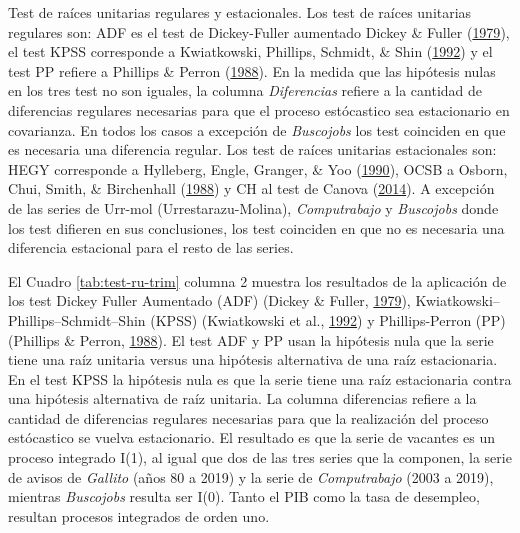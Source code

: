 \documentclass[12pt,oneside]{reedthesis}
\begin{document}
\begin{table}
{\begin{threeparttable}
\begin{tablenotes}
\item \footnotesize Test de raíces unitarias regulares y estacionales. Los test de raíces unitarias regulares son: ADF es el test de Dickey-Fuller aumentado Dickey \& Fuller (\protect\hyperlink{ref-DickeyFuller1979}{1979}), el test KPSS corresponde a Kwiatkowski, Phillips, Schmidt, \& Shin (\protect\hyperlink{ref-KPSS1992}{1992}) y el test PP refiere a Phillips \& Perron (\protect\hyperlink{ref-PhillipsPerron1988}{1988}). En la medida que las hipótesis nulas en los tres test no son iguales, la columna \textit{Diferencias} refiere a la cantidad de diferencias regulares necesarias para que el proceso estócastico sea estacionario en covarianza. En todos los casos a excepción de \textit{Buscojobs} los test coinciden en que es necesaria una diferencia regular. Los test de raíces unitarias estacionales son: HEGY corresponde a Hylleberg, Engle, Granger, \& Yoo (\protect\hyperlink{ref-hegy1990}{1990}), OCSB a Osborn, Chui, Smith, \& Birchenhall (\protect\hyperlink{ref-Osborn1988}{1988}) y CH al test de Canova (\protect\hyperlink{ref-Canova1995}{2014}). A excepción de las series de Urr-mol (Urrestarazu-Molina), \textit{Computrabajo} y \textit{Buscojobs} donde los test difieren en sus conclusiones, los test coinciden en que no es necesaria una diferencia estacional para el resto de las series.
\end{tablenotes}
\end{threeparttable}}
\end{table}
El Cuadro \ref{tab:test-ru-trim} columna 2 muestra los resultados de la aplicación de los test Dickey Fuller Aumentado (ADF) (Dickey \& Fuller, \protect\hyperlink{ref-DickeyFuller1979}{1979}), Kwiatkowski--Phillips--Schmidt--Shin (KPSS) (Kwiatkowski et al., \protect\hyperlink{ref-KPSS1992}{1992}) y Phillips-Perron (PP) (Phillips \& Perron, \protect\hyperlink{ref-PhillipsPerron1988}{1988}). El test ADF y PP usan la hipótesis nula que la serie tiene una raíz unitaria versus una hipótesis alternativa de una raíz estacionaria. En el test KPSS la hipótesis nula es que la serie tiene una raíz estacionaria contra una hipótesis alternativa de raíz unitaria. La columna diferencias refiere a la cantidad de diferencias regulares necesarias para que la realización del proceso estócastico se vuelva estacionario. El resultado es que la serie de vacantes es un proceso integrado I(1), al igual que dos de las tres series que la componen, la serie de avisos de \emph{Gallito} (años 80 a 2019) y la serie de \emph{Computrabajo} (2003 a 2019), mientras \emph{Buscojobs} resulta ser I(0). Tanto el PIB como la tasa de desempleo, resultan procesos integrados de orden uno.
\end{document}
